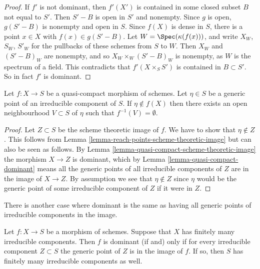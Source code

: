 \begin{proof}
If $f'$ is not dominant, then $f'(X')$ is contained in some closed
subset $B$ not equal to $S'$. Then $S'-B$ is open in $S'$ and nonempty.
Since $g$ is open, $g(S'-B)$ is nonempty and open in $S$. Since $f(X)$
is dense in $S$, there is a point $x\in X$ with $f(x) \in g(S'-B)$.
Let $W = \Spec(\kappa (f(x)))$,
and write $X_W$, $S_W$, $S'_W$ for the pullbacks
of these schemes from $S$ to $W$. Then $X_W$ and $(S'-B)_W$ are nonempty,
and so $X_W \times_W (S'-B)_W$ is nonempty, as $W$ is the spectrum
of a field. This contradicts that $f'(X \times_S S')$ is contained
in $B \subset S'$. So in fact $f'$ is dominant.
\end{proof}

\begin{lemma}
\label{lemma-quasi-compact-generic-point-not-in-image}
Let $f : X \to S$ be a quasi-compact morphism of schemes.
Let $\eta \in S$ be a generic point of an irreducible
component of $S$. If $\eta \not \in f(X)$ then there
exists an open neighbourhood $V \subset S$ of $\eta$
such that $f^{-1}(V) = \emptyset$.
\end{lemma}

\begin{proof}
Let $Z \subset S$ be the scheme theoretic image of $f$.
We have to show that $\eta \not \in Z$.
This follows from
Lemma \ref{lemma-reach-points-scheme-theoretic-image}
but can also be seen as follows.
By Lemma \ref{lemma-quasi-compact-scheme-theoretic-image}
the morphism $X \to Z$ is dominant, which by
Lemma \ref{lemma-quasi-compact-dominant}
means all the generic points of all irreducible components of $Z$
are in the image of $X \to Z$. By assumption we see that
$\eta \not \in Z$ since $\eta$ would be the generic
point of some irreducible component of $Z$ if it were in $Z$.
\end{proof}

\noindent
There is another case where dominant is the same as having all
generic points of irreducible components in the image.

\begin{lemma}
\label{lemma-dominant-finite-number-irreducible-components}
Let $f : X \to S$ be a morphism of schemes.
Suppose that $X$ has finitely many irreducible components.
Then $f$ is dominant (if and) only if for every irreducible
component $Z \subset S$ the generic point of $Z$ is in the
image of $f$. If so, then $S$ has finitely many irreducible
components as well.
\end{lemma}

